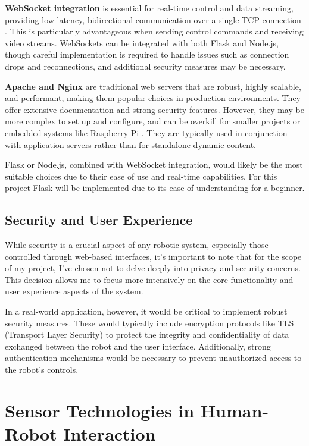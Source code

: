 \textbf{WebSocket integration} is essential for real-time control and data streaming, providing low-latency, bidirectional communication over a single TCP connection \cite{websockets}. This is particularly advantageous when sending control commands and receiving video streams. WebSockets can be integrated with both Flask and Node.js, though careful implementation is required to handle issues such as connection drops and reconnections, and additional security measures may be necessary.

\textbf{Apache and Nginx} are traditional web servers that are robust, highly scalable, and performant, making them popular choices in production environments. They offer extensive documentation and strong security features. However, they may be more complex to set up and configure, and can be overkill for smaller projects or embedded systems like Raspberry Pi \cite{jankov2019}. They are typically used in conjunction with application servers rather than for standalone dynamic content.

Flask or Node.js, combined with WebSocket integration, would likely be the most suitable choices due to their ease of use and real-time capabilities. For this project Flask will be implemented due to its ease of understanding for a beginner.

\subsection{Security and User Experience}

While security is a crucial aspect of any robotic system, especially those controlled through web-based interfaces, it's important to note that for the scope of my project, I've chosen not to delve deeply into privacy and security concerns. This decision allows me to focus more intensively on the core functionality and user experience aspects of the system.

In a real-world application, however, it would be critical to implement robust security measures. These would typically include encryption protocols like TLS (Transport Layer Security) to protect the integrity and confidentiality of data exchanged between the robot and the user interface. Additionally, strong authentication mechanisms would be necessary to prevent unauthorized access to the robot's controls.

\section{Sensor Technologies in Human-Robot Interaction}

